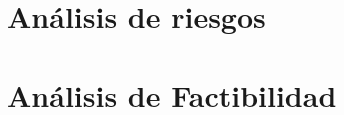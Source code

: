 \section{Análisis de riesgos}
\label{sec:analisis_riesgos}


\section{Análisis de Factibilidad}
\label{sec:analisis_factibilidad}

